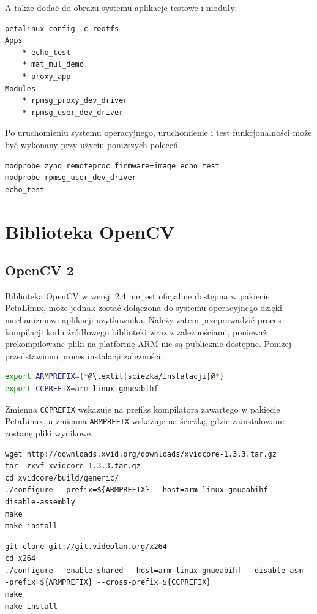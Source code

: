 A także dodać do obrazu systemu aplikacje testowe i moduły:
\begin{lstlisting}
petalinux-config -c rootfs
Apps
	* echo_test
	* mat_mul_demo
	* proxy_app
Modules
	* rpmsg_proxy_dev_driver
	* rpmsg_user_dev_driver
\end{lstlisting}

Po uruchomieniu systemu operacyjnego, uruchomienie i test funkcjonalności może być wykonany przy użyciu poniższych poleceń.

\begin{lstlisting}
modprobe zynq_remoteproc firmware=image_echo_test
modprobe rpmsg_user_dev_driver
echo_test
\end{lstlisting}

\section{Biblioteka OpenCV}
\label{sec:opencv-config}
\subsection{OpenCV 2}
Biblioteka OpenCV w wersji 2.4 nie jest oficjalnie dostępna w pakiecie PetaLinux, może jednak zostać dołączona do systemu operacyjnego dzięki mechanizmowi aplikacji użytkownika.
Należy zatem przeprowadzić proces kompilacji kodu źródłowego biblioteki wraz z zależnościami, ponieważ prekompilowane pliki na platformę ARM nie są publicznie dostępne. Poniżej przedstawiono proces instalacji zależności.

\begin{lstlisting}[breaklines=true, language=Bash, caption=Definicja zmiennych środowiskowych.]
export ARMPREFIX=(*@\textit{ścieżka/instalacji}@*)
export CCPREFIX=arm-linux-gnueabihf-
\end{lstlisting}

Zmienna \texttt{CCPREFIX} wskazuje na prefiks kompilatora zawartego w pakiecie PetaLinux, a zmienna \texttt{ARMPREFIX} wskazuje na ścieżkę, gdzie zainstalowane zostanę pliki wynikowe.

\begin{lstlisting}[breaklines=true, caption=Kompilacja biblioteki \textit{xVideo}.]
wget http://downloads.xvid.org/downloads/xvidcore-1.3.3.tar.gz
tar -zxvf xvidcore-1.3.3.tar.gz
cd xvidcore/build/generic/
./configure --prefix=${ARMPREFIX} --host=arm-linux-gnueabihf --disable-assembly
make
make install
\end{lstlisting}

\begin{lstlisting}[breaklines=true, caption=Kompilacja biblioteki \textit{x264}.]
git clone git://git.videolan.org/x264
cd x264
./configure --enable-shared --host=arm-linux-gnueabihf --disable-asm --prefix=${ARMPREFIX} --cross-prefix=${CCPREFIX}
make
make install
\end{lstlisting}

